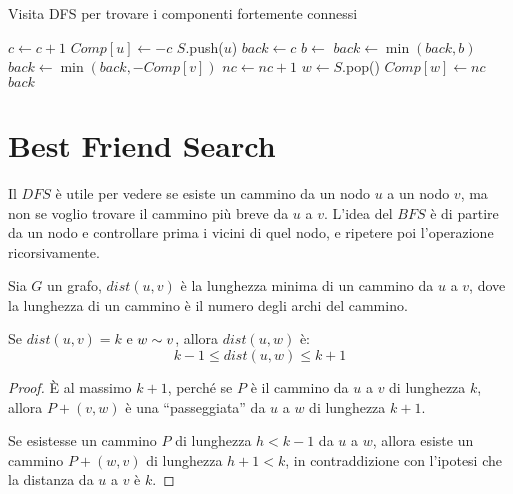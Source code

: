 \begin{algorithm}
\caption{Visita DFS per trovare i componenti fortemente connessi}
\begin{algorithmic}[1]
    \State $c \gets c + 1$
    \State $Comp[u] \gets -c$
    \State $S$.push($u$)
    \State $back \gets c$
            \State $b \gets$ 
            \State $back \gets \min(back, b)$
        \EndIf
            \State $back \gets \min(back, -Comp[v])$
        \EndIf
    \EndFor
        \State $nc \gets nc + 1$
        \Repeat
            \State $w \gets S$.pop()
            \State $Comp[w] \gets nc$
    \EndIf
    \State \Return $back$
\EndFunction
\end{algorithmic}
\end{algorithm}

\section{Best Friend Search}
\label{sezione_visita_bfs}

Il $DFS$ \`e utile per vedere se esiste un cammino da un nodo $u$ a un nodo $v$, ma non se voglio trovare il cammino pi\`u breve da $u$ a $v$. L'idea del $BFS$ \`e di partire da un nodo e controllare prima i vicini di quel nodo, e ripetere poi l'operazione ricorsivamente.

Sia $G$ un grafo, $dist(u,v)$ \`e la lunghezza minima di un cammino da $u$ a $v$, dove la lunghezza di un cammino \`e il numero degli archi del cammino.

\begin{prop}
Se $dist(u,v) = k$ e $w \sim v$, allora $dist(u,w)$ \`e:
\[
k - 1 \le dist(u,w) \le k + 1
\]
\end{prop}

\begin{proof}
\`E al massimo $k+1$, perch\'e se $P$ \`e il cammino da $u$ a $v$ di lunghezza $k$, allora $P + (v,w)$ \`e una ``passeggiata'' da $u$ a $w$ di lunghezza $k+1$.

Se esistesse un cammino $P$ di lunghezza $h < k - 1$ da $u$ a $w$, allora esiste un cammino $P + (w,v)$ di lunghezza $h + 1 < k$, in contraddizione con l'ipotesi che la distanza da $u$ a $v$ \`e $k$.
\end{proof}

